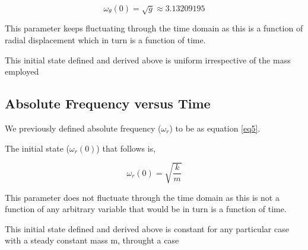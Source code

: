                 $$\omega_\theta(0) = \sqrt{g} \approx 3.13209195$$
                
                {This parameter keeps fluctuating through the time domain as this is a function of radial displacement which in turn is a function of time.}
                
                {This initial state defined and derived above is uniform irrespective of the mass employed}
                
    
    \subsection{{Absolute Frequency versus Time}}
                
                {We previously defined absolute frequency ($\omega_r$) to be as equation \ref{eq5}.}
                
                {The initial state ($\omega_r(0)$) that follows is,}
                
                $$\omega_r(0) = \sqrt{\frac{k}{m}}$$
                
                {This parameter does not fluctuate through the time domain as this is not a function of any arbitrary variable that would be in turn is a function of time.}
                
                {This initial state defined and derived above is constant for any particular case with a steady constant mass m, throught a case}
            
            



